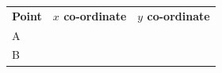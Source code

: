 {{\begin{center}
\begin{xtabular}[t]{|l|l|l|}
    
        
                  \textbf{Point}
                 &
    
    
        
                  \textbf{$x$ co-ordinate}
                 &
    
    
        
                  \textbf{$y$ co-ordinate}
     \tabularnewline{}
    
    
        A &
    
    
         &
    
    
     \tabularnewline{}
    
    
        B &
    
    

\end{xtabular}
\end{center}}}
